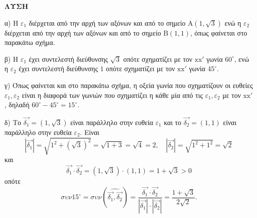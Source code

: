 \textbf{ΛΥΣΗ}

α) Η $\varepsilon_1$ διέρχεται από την αρχή των αξόνων και από το σημείο $\text{A}(1,\sqrt{3})$ ενώ η $\varepsilon_2$ διέρχεται από την αρχή των αξόνων και από το σημείο $\text{B}(1,1)$, όπως φαίνεται στο παρακάτω σχήμα.

β) Η $\varepsilon_1$ έχει συντελεστή διεύθυνσης $\sqrt{3}$ οπότε σχηματίζει με τον $\text{xx}'$ γωνία $60^\circ$, ενώ η $\varepsilon_2$ έχει συντελεστή διεύθυνσης $1$ οπότε σχηματίζει με τον $\text{xx}'$ γωνία $45^\circ$.

γ) Όπως φαίνεται και στο παρακάτω σχήμα, η οξεία γωνία που σχηματίζουν οι ευθείες $\varepsilon_1,\varepsilon_2$ είναι η διαφορά των γωνιών που σχηματίζει η κάθε μία από τις $\varepsilon_1,\varepsilon_2$ με τον $\text{xx}'$, δηλαδή $60^\circ-45^\circ=15^\circ$.

δ) Το $\vec{\delta_1} = (1,\sqrt{3})$ είναι παράλληλο στην ευθεία $\varepsilon_1$ και το $\vec{\delta_2} = (1,1)$ είναι παράλληλο στην ευθεία $\varepsilon_2$.
Είναι
\[
\left|\vec{\delta_1}\right| = \sqrt{1^2+(\sqrt{3})^2} = \sqrt{1+3} = \sqrt{4} = 2, \quad \left|\vec{\delta_2}\right| = \sqrt{1^2+1^2} = \sqrt{2}
\]
και
\[
\vec{\delta_1} \cdot \vec{\delta_2} = (1,\sqrt{3}) \cdot (1,1) = 1+\sqrt{3} > 0
\]
οπότε
\[
\sigma\upsilon\nu 15^\circ = \sigma\upsilon\nu \left(\widehat{\vec{\delta_1},\vec{\delta_2}}\right) = \frac{\vec{\delta_1} \cdot \vec{\delta_2}}{|\vec{\delta_1}| \cdot |\vec{\delta_2}|} = \frac{1+\sqrt{3}}{2\sqrt{2}}.
\]

\endlysh